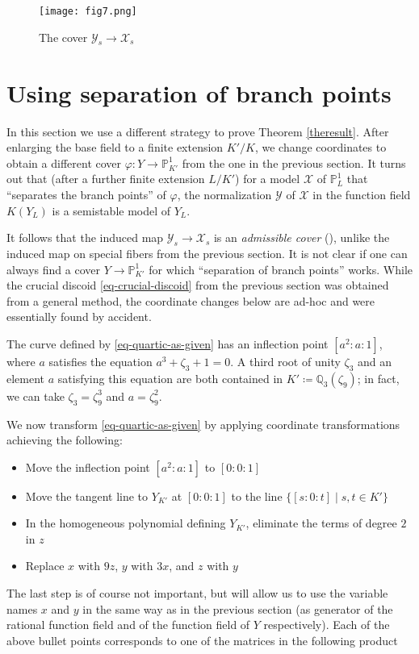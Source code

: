 \documentclass[11pt]{amsart}
\renewcommand{\phi}{\varphi}
\newcommand{\BP}{{\mathbb{P}}}
\newcommand{\BQ}{{\mathbb{Q}}}
\newcommand{\CX}{{\mathcal X}}
\newcommand{\CY}{{\mathcal Y}}
\theoremstyle{definition}
\begin{document}
\begin{figure}[!htb]
\centering
\texttt{[image: fig7.png]}
\caption{The cover $\CY_s\to\CX_s$}
\label{fig-7}
\end{figure}




\section{Using separation of branch points}

In this section we use a different strategy to prove Theorem \ref{theresult}. After enlarging the base field to a finite extension $K'/K$, we change coordinates to obtain a different cover $\phi\colon Y\to\BP_{K'}^1$ from the one in the previous section. It turns out that (after a further finite extension $L/K'$) for a model $\CX$ of $\BP_L^1$ that ``separates the branch points'' of $\phi$, the normalization $\CY$ of $\CX$ in the function field $K(Y_L)$ is a semistable model of $Y_L$. 

It follows that the induced map $\CY_s\to\CX_s$ is an \emph{admissible cover} (\cite[Section 4]{harrismumford}), unlike the induced map on special fibers from the previous section. It is not clear if one can always find a cover $Y\to\BP^1_{K'}$ for which ``separation of branch points'' works. While the crucial discoid \eqref{eq-crucial-discoid} from the previous section was obtained from a general method, the coordinate changes below are ad-hoc and were essentially found by accident.



The curve defined by \eqref{eq-quartic-as-given} has an inflection point $[a^2:a:1]$, where $a$ satisfies the equation $a^3+\zeta_3+1=0$. A third root of unity $\zeta_3$ and an element $a$ satisfying this equation are both contained in $K'\coloneqq\BQ_3(\zeta_9)$; in fact, we can take $\zeta_3=\zeta_9^3$ and  $a=\zeta_9^2$.

We now transform \eqref{eq-quartic-as-given} by applying coordinate transformations achieving the following:
\begin{itemize}
\item Move the inflection point $[a^2:a:1]$ to $[0:0:1]$
\item Move the tangent line to $Y_{K'}$
at $[0:0:1]$ to the line $\{[s:0:t]\mid s,t\in K'\}$
\item In the homogeneous polynomial defining $Y_{K'}$, eliminate the terms of degree $2$ in $z$
\item Replace $x$ with $9z$, $y$ with $3x$, and $z$ with $y$
\end{itemize}
The last step is of course not important, but will allow us to use the variable names $x$ and $y$ in the same way as in the previous section (as generator of the rational function field and of the function field of $Y$ respectively). Each of the above bullet points corresponds to one of the matrices in the following product
\end{document}
